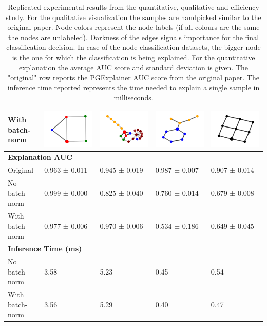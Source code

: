 \begin{table}[]
\begin{tabular}{lllll}
With batch-norm & \includegraphics[width=.1\linewidth]{../openreview/imgs/replication/syn1.png}
& \includegraphics[width=.1\linewidth]{../openreview/imgs/replication/syn2.png} & \includegraphics[width=.1\linewidth]{../openreview/imgs/replication/syn3.png} & \multicolumn{1}{l}{\includegraphics[width=.1\linewidth]{../openreview/imgs/replication/syn4.png}}  \\ \hline
\multicolumn{5}{l}{\textbf{Explanation AUC}} \\ \hline
Original & 0.963 ± 0.011 & 0.945 ± 0.019 & 0.987 ± 0.007 & \multicolumn{1}{l}{0.907 ± 0.014}  \\ 
No batch-norm & 0.999 ± 0.000 & 0.825 ± 0.040 & 0.760 ± 0.014 & \multicolumn{1}{l}{0.679 ± 0.008} \\
With batch-norm & 0.977 ± 0.006 & 0.970 ± 0.006 & 0.534 ± 0.186 & \multicolumn{1}{l}{0.649 ± 0.045}  \\ \hline
\multicolumn{5}{l}{\textbf{Inference Time (ms)}} \\ \hline
No batch-norm & 3.58 & 5.23 & 0.45 & \multicolumn{1}{l}{0.54} \\
With batch-norm & 3.56 & 5.29 & 0.40 & \multicolumn{1}{l}{0.47} \\ \bottomrule
\end{tabular}
\caption{Replicated experimental results from the quantitative, qualitative and efficiency study. For the qualitative visualization the samples are handpicked similar to the original paper. Node colors represent the node labels (if all colours are the same the nodes are unlabeled). Darkness of the edges signals importance for the final classification decision. In case of the node-classification datasets, the bigger node is the one for which the classification is being explained. For the quantitative explanation the average AUC score and standard deviation is given. The "original" row reports the PGExplainer AUC score from the original paper. The inference time reported represents the time needed to explain a single sample in milliseconds.}
\label{tab:reproduction_results}
\end{table}


